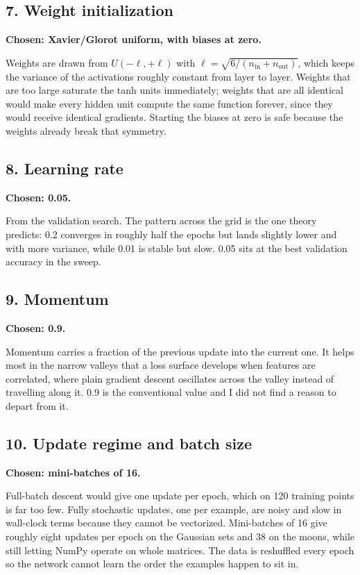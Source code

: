 \documentclass[11pt]{article}
\begin{document}
\subsection*{7. Weight initialization}
\textbf{Chosen: Xavier/Glorot uniform, with biases at zero.}

Weights are drawn from $U(-\ell, +\ell)$ with $\ell = \sqrt{6/(n_{\text{in}} +
n_{\text{out}})}$, which keeps the variance of the activations roughly constant
from layer to layer. Weights that are too large saturate the tanh units
immediately; weights that are all identical would make every hidden unit compute
the same function forever, since they would receive identical gradients.
Starting the biases at zero is safe because the weights already break that
symmetry.

\subsection*{8. Learning rate}
\textbf{Chosen: 0.05.}

From the validation search. The pattern across the grid is the one theory
predicts: 0.2 converges in roughly half the epochs but lands slightly lower and
with more variance, while 0.01 is stable but slow. 0.05 sits at the best
validation accuracy in the sweep.

\subsection*{9. Momentum}
\textbf{Chosen: 0.9.}

Momentum carries a fraction of the previous update into the current one. It
helps most in the narrow valleys that a loss surface develops when features are
correlated, where plain gradient descent oscillates across the valley instead of
travelling along it. 0.9 is the conventional value and I did not find a reason
to depart from it.

\subsection*{10. Update regime and batch size}
\textbf{Chosen: mini-batches of 16.}

Full-batch descent would give one update per epoch, which on 120 training points
is far too few. Fully stochastic updates, one per example, are noisy and slow in
wall-clock terms because they cannot be vectorized. Mini-batches of 16 give
roughly eight updates per epoch on the Gaussian sets and 38 on the moons, while
still letting NumPy operate on whole matrices. The data is reshuffled every
epoch so the network cannot learn the order the examples happen to sit in.
\end{document}
